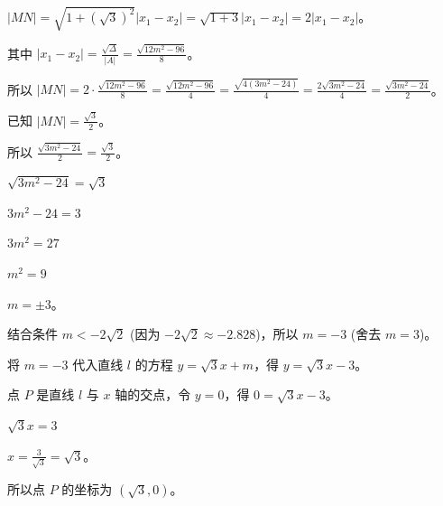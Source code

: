\documentclass[varwidth=16cm, border=2mm]{standalone}
\begin{document}
{$|MN| = \sqrt{1+(\sqrt{3})^2}|x_1-x_2| = \sqrt{1+3}|x_1-x_2| = 2|x_1-x_2|$。

其中 $|x_1-x_2| = \frac{\sqrt{\Delta}}{|A|} = \frac{\sqrt{12m^2-96}}{8}$。

所以 $|MN| = 2 \cdot \frac{\sqrt{12m^2-96}}{8} = \frac{\sqrt{12m^2-96}}{4} = \frac{\sqrt{4(3m^2-24)}}{4} = \frac{2\sqrt{3m^2-24}}{4} = \frac{\sqrt{3m^2-24}}{2}$。

已知 $|MN| = \frac{\sqrt{3}}{2}$。

所以 $\frac{\sqrt{3m^2-24}}{2} = \frac{\sqrt{3}}{2}$。

$\sqrt{3m^2-24} = \sqrt{3}$ 

$3m^2 - 24 = 3$ 

$3m^2 = 27$ 

$m^2 = 9$ 

$m = \pm 3$。

结合条件 $m < -2\sqrt{2}$ (因为 $-2\sqrt{2} \approx -2.828$)，所以 $m = -3$ (舍去 $m=3$)。

将 $m = -3$ 代入直线 $l$ 的方程 $y = \sqrt{3}x + m$，得 $y = \sqrt{3}x - 3$。

点 $P$ 是直线 $l$ 与 $x$ 轴的交点，令 $y=0$，得 $0 = \sqrt{3}x - 3$。

$\sqrt{3}x = 3$ 

$x = \frac{3}{\sqrt{3}} = \sqrt{3}$。

所以点 $P$ 的坐标为 $(\sqrt{3}, 0)$。}
\end{document}
